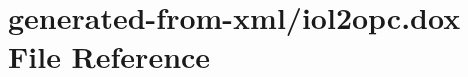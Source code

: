 \hypertarget{iol2opc_8dox}{}\section{generated-\/from-\/xml/iol2opc.dox File Reference}
\label{iol2opc_8dox}
